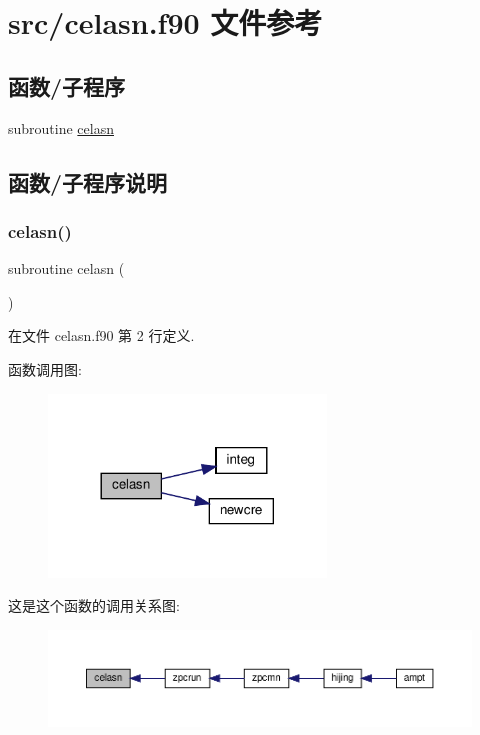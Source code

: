 \hypertarget{celasn_8f90}{}\section{src/celasn.f90 文件参考}
\label{celasn_8f90}
\subsection*{函数/子程序}
\begin{DoxyCompactItemize}
\item 
subroutine \mbox{\hyperlink{celasn_8f90_a23954d3acbb9554482bb962b36db9e10}{celasn}}
\end{DoxyCompactItemize}


\subsection{函数/子程序说明}
\mbox{\label{celasn_8f90_a23954d3acbb9554482bb962b36db9e10}} 
\subsubsection{\texorpdfstring{celasn()}{celasn()}}
{\footnotesize\ttfamily subroutine celasn (\begin{DoxyParamCaption}{ }\end{DoxyParamCaption})}



在文件 celasn.\+f90 第 2 行定义.

函数调用图\+:
\nopagebreak
\begin{figure}[H]
\begin{center}
\leavevmode
\includegraphics[width=209pt]{celasn_8f90_a23954d3acbb9554482bb962b36db9e10_cgraph}
\end{center}
\end{figure}
这是这个函数的调用关系图\+:
\nopagebreak
\begin{figure}[H]
\begin{center}
\leavevmode
\includegraphics[width=350pt]{celasn_8f90_a23954d3acbb9554482bb962b36db9e10_icgraph}
\end{center}
\end{figure}
